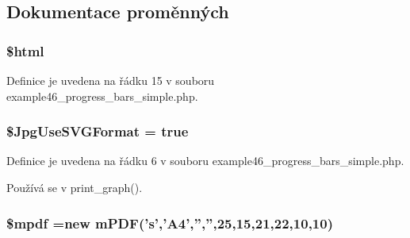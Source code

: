 \subsection{Dokumentace proměnných}
\hypertarget{example46__progress__bars__simple_8php_a6f96e7fc92441776c9d1cd3386663b40}{
\subsubsection[{\$html}]{\setlength{\rightskip}{0pt plus 5cm}\$html}}\label{example46__progress__bars__simple_8php_a6f96e7fc92441776c9d1cd3386663b40}


Definice je uvedena na řádku 15 v souboru example46\-\_\-progress\-\_\-bars\-\_\-simple.\-php.

\hypertarget{example46__progress__bars__simple_8php_a4767d5ef05aa1f95f7a64c0aa8f26ccc}{
\subsubsection[{\$\-Jpg\-Use\-S\-V\-G\-Format}]{\setlength{\rightskip}{0pt plus 5cm}\$Jpg\-Use\-S\-V\-G\-Format = true}}\label{example46__progress__bars__simple_8php_a4767d5ef05aa1f95f7a64c0aa8f26ccc}


Definice je uvedena na řádku 6 v souboru example46\-\_\-progress\-\_\-bars\-\_\-simple.\-php.



Používá se v print\-\_\-graph().

\hypertarget{example46__progress__bars__simple_8php_ad028f81910d6cbab9b184d2214b3a8f8}{
\subsubsection[{\$mpdf}]{\setlength{\rightskip}{0pt plus 5cm}\$mpdf =new {\bf m\-P\-D\-F}('s','A4','','',25,15,21,22,10,10)}}\label{example46__progress__bars__simple_8php_ad028f81910d6cbab9b184d2214b3a8f8}


